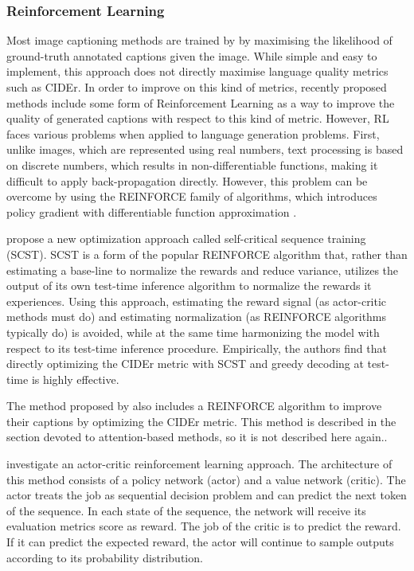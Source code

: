 \subsubsection{Reinforcement Learning}

Most image captioning methods are trained by by maximising the likelihood of ground-truth annotated captions given the image. While simple and easy to implement, this approach does not directly maximise language quality metrics such as CIDEr. In order to improve on this kind of metrics, recently proposed methods include some form of Reinforcement Learning as a way to improve the quality of generated captions with respect to this kind of metric. However, RL faces various problems when applied to language generation problems. First, unlike images, which are represented using real numbers, text processing is based on discrete numbers, which results in non-differentiable functions, making it difficult to apply back-propagation directly. However, this problem can be overcome by using the REINFORCE family of algorithms, which introduces policy gradient with differentiable function approximation \citep{Sutton1999}.

\cite{Rennie2017} propose a new optimization approach called self-critical sequence training (SCST). SCST is a form of the popular REINFORCE algorithm that, rather than estimating a base-line to normalize the rewards and reduce variance, utilizes the output of its own test-time inference algorithm to normalize the rewards it experiences. Using this approach, estimating the reward signal (as actor-critic methods must do) and estimating normalization (as REINFORCE algorithms typically do) is avoided, while at the same time harmonizing the model with respect to its test-time inference procedure. Empirically, the authors find that directly optimizing the CIDEr metric with SCST and greedy decoding at test-time is highly effective.

The method proposed by \citet{Li2018_VS-LSTM} also includes a REINFORCE algorithm to improve their captions by optimizing the CIDEr metric. This method is described in the section devoted to attention-based methods, so it is not described here again..

\cite{Zhang2017} investigate an actor-critic reinforcement learning \citep{Barto1983} approach. The architecture of this method consists of a policy network (actor) and a value network (critic). The actor treats the job as sequential decision problem and can predict the next token of the sequence. In each state of the sequence, the network will receive its evaluation metrics score as reward. The job of the critic is to predict the reward. If it can predict the expected reward, the actor will continue to sample outputs according to its probability distribution. 

